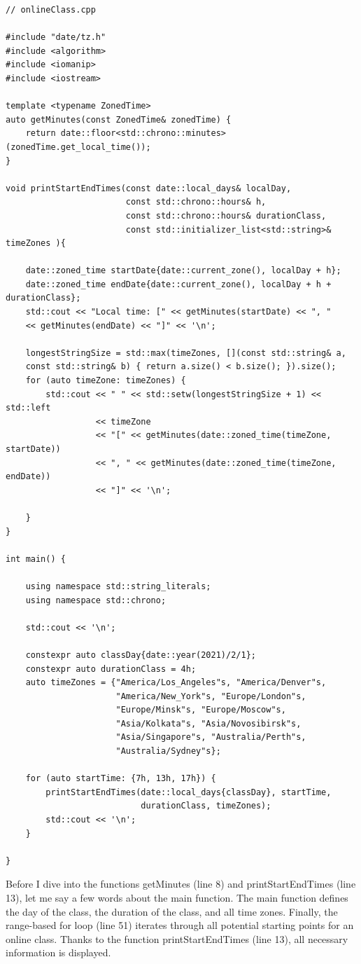 \begin{lstlisting}[style=styleCXX]
// onlineClass.cpp

#include "date/tz.h"
#include <algorithm>
#include <iomanip>
#include <iostream>

template <typename ZonedTime>
auto getMinutes(const ZonedTime& zonedTime) {
	return date::floor<std::chrono::minutes>(zonedTime.get_local_time());
}

void printStartEndTimes(const date::local_days& localDay,
						const std::chrono::hours& h,
						const std::chrono::hours& durationClass,
						const std::initializer_list<std::string>& timeZones ){
	
	date::zoned_time startDate{date::current_zone(), localDay + h};
	date::zoned_time endDate{date::current_zone(), localDay + h + durationClass};
	std::cout << "Local time: [" << getMinutes(startDate) << ", "
	<< getMinutes(endDate) << "]" << '\n';
	
	longestStringSize = std::max(timeZones, [](const std::string& a,
	const std::string& b) { return a.size() < b.size(); }).size();
	for (auto timeZone: timeZones) {
		std::cout << " " << std::setw(longestStringSize + 1) << std::left
		          << timeZone
		          << "[" << getMinutes(date::zoned_time(timeZone, startDate))
		          << ", " << getMinutes(date::zoned_time(timeZone, endDate))
		          << "]" << '\n';
		
	}
}

int main() {

	using namespace std::string_literals;
	using namespace std::chrono;
	
	std::cout << '\n';
	
	constexpr auto classDay{date::year(2021)/2/1};
	constexpr auto durationClass = 4h;
	auto timeZones = {"America/Los_Angeles"s, "America/Denver"s,
					  "America/New_York"s, "Europe/London"s,
					  "Europe/Minsk"s, "Europe/Moscow"s,
					  "Asia/Kolkata"s, "Asia/Novosibirsk"s,
					  "Asia/Singapore"s, "Australia/Perth"s,
					  "Australia/Sydney"s};
	
	for (auto startTime: {7h, 13h, 17h}) {
		printStartEndTimes(date::local_days{classDay}, startTime,
						   durationClass, timeZones);
		std::cout << '\n';
	}

}
\end{lstlisting}

Before I dive into the functions getMinutes (line 8) and printStartEndTimes (line 13), let me say a few words about the main function. The main function defines the day of the class, the duration of the class, and all time zones. Finally, the range-based for loop (line 51) iterates through all potential starting points for an online class. Thanks to the function printStartEndTimes (line 13), all necessary information is displayed.

